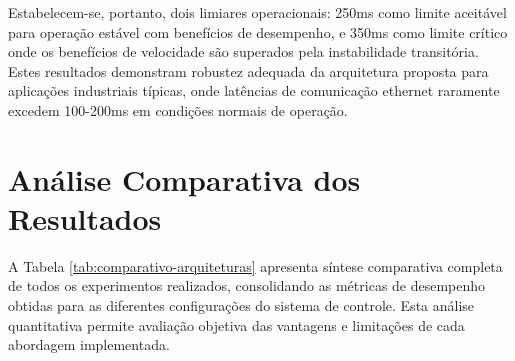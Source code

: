 Estabelecem-se, portanto, dois limiares operacionais: 250ms como limite aceitável para operação estável com benefícios de desempenho, e 350ms como limite crítico onde os benefícios de velocidade são superados pela instabilidade transitória. Estes resultados demonstram robustez adequada da arquitetura proposta para aplicações industriais típicas, onde latências de comunicação ethernet raramente excedem 100-200ms em condições normais de operação.

\section{Análise Comparativa dos Resultados}
\label{sec:fuzzyresultado}

A Tabela \ref{tab:comparativo-arquiteturas} apresenta síntese comparativa completa de todos os experimentos realizados, consolidando as métricas de desempenho obtidas para as diferentes configurações do sistema de controle. Esta análise quantitativa permite avaliação objetiva das vantagens e limitações de cada abordagem implementada.

